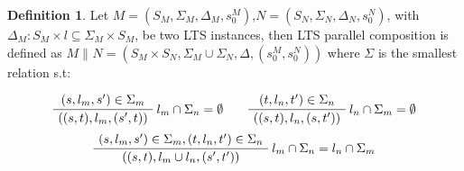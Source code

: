 \documentclass{article}
\theoremstyle{definition}
\newtheorem{definition}{Definition}[section]
\newcommand{\automaton}[1]{$#1 = (S_{#1}, \Sigma_{#1}, \Delta_{#1}, s_{0}^{#1})$}
\newcommand{\ltsComposition}[3]{$#1 \parallel_{#3} #2 = (S_{#1}\times S_{#2}, \Sigma_{#1} \cup \Sigma_{#2}, \Delta, (s_{0}^{#1},s_{0}^{#2}))$}
\begin{document}
\begin{definition} 
	Let \automaton{M},\automaton{N}, with $\Delta_M : S_M \times l \subseteq \Sigma_M \times S_M$, be two LTS instances, then LTS parallel composition is defined as \ltsComposition{M}{N}{} where $\Sigma$ is the smallest relation s.t:
	\begin{center}
		\begin{equation}
			\AxiomC{$(s, l_m, s') \in \Sigma_m $}\RightLabel{$l_m \cap \Sigma_n = \emptyset$}
			\UnaryInfC{$((s,t),l_m,(s',t))$}
			\DisplayProof
			\quad\quad
			\AxiomC{$(t, l_n, t') \in \Sigma_n $}\RightLabel{$l_n \cap \Sigma_m = \emptyset$}
			\UnaryInfC{$((s,t),l_n,(s,t'))$}
			\DisplayProof
		\end{equation}		
		\begin{equation}
		\AxiomC{$(s, l_m, s') \in \Sigma_m,(t, l_n, t') \in \Sigma_n  $}\RightLabel{$l_m \cap \Sigma_n = l_n \cap \Sigma_m$}
		\UnaryInfC{$((s,t),l_m \cup l_n,(s',t'))$}
		\DisplayProof
		\end{equation}	
	\end{center}
\end{definition}
\end{document}
